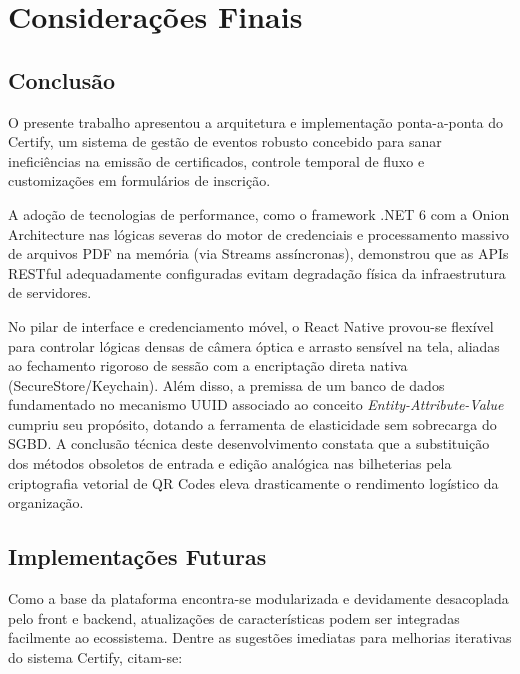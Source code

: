 \chapter{Considerações Finais}

\section{Conclusão}

O presente trabalho apresentou a arquitetura e implementação ponta-a-ponta do Certify, um sistema de gestão de eventos robusto concebido para sanar ineficiências na emissão de certificados, controle temporal de fluxo e customizações em formulários de inscrição.

A adoção de tecnologias de performance, como o framework .NET 6 com a Onion Architecture nas lógicas severas do motor de credenciais e processamento massivo de arquivos PDF na memória (via Streams assíncronas), demonstrou que as APIs RESTful adequadamente configuradas evitam degradação física da infraestrutura de servidores.

No pilar de interface e credenciamento móvel, o React Native provou-se flexível para controlar lógicas densas de câmera óptica e arrasto sensível na tela, aliadas ao fechamento rigoroso de sessão com a encriptação direta nativa (SecureStore/Keychain). Além disso, a premissa de um banco de dados fundamentado no mecanismo UUID associado ao conceito \textit{Entity-Attribute-Value} cumpriu seu propósito, dotando a ferramenta de elasticidade sem sobrecarga do SGBD. A conclusão técnica deste desenvolvimento constata que a substituição dos métodos obsoletos de entrada e edição analógica nas bilheterias pela criptografia vetorial de QR Codes eleva drasticamente o rendimento logístico da organização.

\section{Implementações Futuras}

Como a base da plataforma encontra-se modularizada e devidamente desacoplada pelo front e backend, atualizações de características podem ser integradas facilmente ao ecossistema. Dentre as sugestões imediatas para melhorias iterativas do sistema Certify, citam-se:

